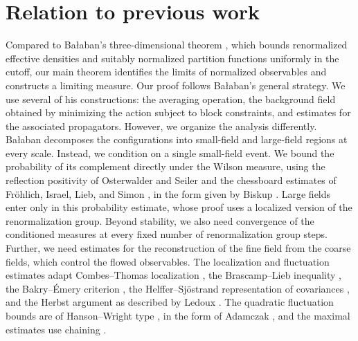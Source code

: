 \section{Relation to previous work}\label{s1:relation}

Compared to Bałaban's three-dimensional theorem \cite{Balaban1985UV}, which bounds renormalized effective densities and suitably normalized partition functions uniformly in the cutoff, our main theorem identifies the limits of normalized observables and constructs a limiting measure. Our proof follows Bałaban's general strategy. We use several of his constructions: the averaging operation, the background field obtained by minimizing the action subject to block constraints, and estimates for the associated propagators. However, we organize the analysis differently. Bałaban decomposes the configurations into small-field and large-field regions at every scale. Instead, we condition on a single small-field event. We bound the probability of its complement directly under the Wilson measure, using the reflection positivity of Osterwalder and Seiler \cite{OsterwalderSeiler1978} and the chessboard estimates of Fr\"ohlich, Israel, Lieb, and Simon \cite{FILS1978,FILS1980}, in the form given by Biskup \cite{Biskup2009}. Large fields enter only in this probability estimate, whose proof uses a localized version of the renormalization group. Beyond stability, we also need convergence of the conditioned measures at every fixed number of renormalization group steps. Further, we need estimates for the reconstruction of the fine field from the coarse fields, which control the flowed observables. The localization and fluctuation estimates adapt Combes--Thomas localization \cite{CombesThomas1973}, the Brascamp--Lieb inequality \cite{BrascampLieb1976}, the Bakry--\'Emery criterion \cite{BakryEmery1985}, the Helffer--Sj\"ostrand representation of covariances \cite{HelfferSjostrand1994}, and the Herbst argument as described by Ledoux \cite{Ledoux1999}. The quadratic fluctuation bounds are of Hanson--Wright type \cite{HansonWright1971}, in the form of Adamczak \cite{Adamczak2015}, and the maximal estimates use chaining \cite{Dudley1967,Dirksen2015}.

